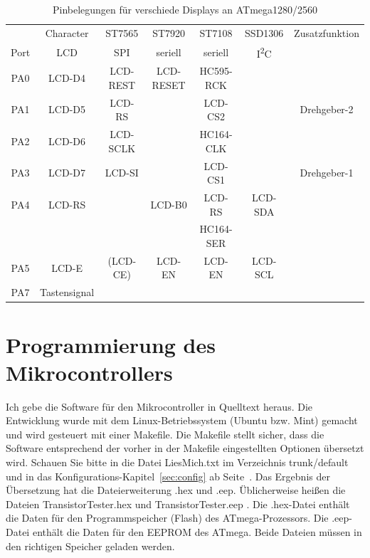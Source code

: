 \begin{table}[H]
  \begin{center}
    \begin{tabular}{| c || c | c | c | c | c | c |}
    \hline
           & Character     &  ST7565     & ST7920       & ST7108       & SSD1306     & Zusatzfunktion \\
      Port & LCD           &    SPI      & seriell      & seriell      &    I\textsuperscript{2}C      & \\
    \hline
    \hline
    PA0    &  LCD-D4       &   LCD-REST  &  LCD-RESET   & HC595-RCK       &             & \\
    \hline
    PA1    &  LCD-D5       &   LCD-RS    &              & LCD-CS2        &             & Drehgeber-2 \\
    \hline
    PA2    &  LCD-D6       &   LCD-SCLK  &              & HC164-CLK      &             & \\
    \hline
    PA3    &  LCD-D7       &   LCD-SI    &              & LCD-CS1        &             & Drehgeber-1 \\
    \hline
    PA4    &  LCD-RS       &             &   LCD-B0     & LCD-RS         &   LCD-SDA   & \\
           &               &             &              & HC164-SER      &             & \\
    \hline
    PA5    &  LCD-E        &  (LCD-CE)   &   LCD-EN     & LCD-EN         &   LCD-SCL  & \\
    \hline
    PA7    &  Tastensignal &             &              &                &             & \\
    \hline
    \end{tabular}
  \end{center}
  \caption{Pinbelegungen für verschiede Displays an ATmega1280/2560}
  \label{tab:display-1280}
\end{table}


\section{Programmierung des Mikrocontrollers}
Ich gebe die Software für den Mikrocontroller in Quelltext heraus.
Die Entwicklung wurde mit dem Linux-Betriebssystem (Ubuntu bzw. Mint) gemacht
und wird gesteuert mit einer Makefile.
Die Makefile stellt sicher, dass die Software entsprechend der vorher in der Makefile 
eingestellten Optionen übersetzt wird. Schauen Sie bitte in die Datei LiesMich.txt
im Verzeichnis trunk/default und in das Konfigurations-Kapitel~\ref{sec:config} ab Seite~\pageref{sec:config}.
Das Ergebnis der Übersetzung hat die Dateierweiterung .hex und .eep.
Üblicherweise heißen die Dateien TransistorTester.hex und TransistorTester.eep .
Die .hex-Datei enthält die Daten für den Programmspeicher (Flash) des ATmega-Prozessors.
Die .eep-Datei enthält die Daten für den EEPROM des ATmega.
Beide Dateien müssen in den richtigen Speicher geladen werden.

